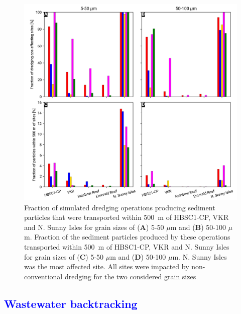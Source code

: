 \documentclass[preprint,12pt,authoryear]{elsarticle}
\newcommand{\modif}[1]{\textcolor{blue}{#1}}
\begin{document}
\begin{figure}
	\centering
	\includegraphics[width=.95\textwidth]{figures/aggregated_stokes4_v3_500m_no_timeline.png}
	\caption{Fraction of simulated dredging operations producing sediment particles that were transported within 500~m of HBSC1-CP, VKR and N. Sunny Isles for grain sizes of (\textbf{A}) 5-50 $\mu$m  and (\textbf{B}) 50-100 $\mu$m. Fraction of the sediment particles produced by these operations transported within 500~m of HBSC1-CP, VKR and N. Sunny Isles for grain sizes of (\textbf{C}) 5-50 $\mu$m  and (\textbf{D}) 50-100 $\mu$m. N. Sunny Isles was the most affected site. All sites were impacted by non-conventional dredging for the two considered grain sizes}\label{fig:onset_bar}
\end{figure}

\modif{\subsection{Wastewater backtracking}}
\end{document}
